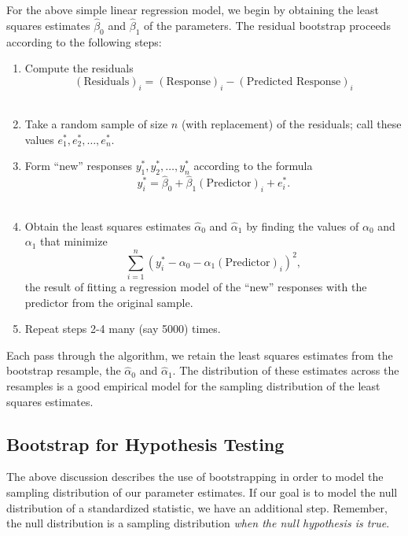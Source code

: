 \documentclass[
  letterpaper,
  DIV=11,
  numbers=noendperiod]{scrreprt}
\providecommand{\tightlist}{%
  \setlength{\itemsep}{0pt}\setlength{\parskip}{0pt}}\usepackage{longtable,booktabs,array}
\theoremstyle{definition}
\theoremstyle{definition}
\theoremstyle{plain}
\theoremstyle{remark}
\begin{document}
For the above simple linear regression model, we begin by obtaining the
least squares estimates \(\widehat{\beta}_0\) and \(\widehat{\beta}_1\)
of the parameters. The residual bootstrap proceeds according to the
following steps:

\begin{enumerate}
\def\labelenumi{\arabic{enumi}.}
\tightlist
\item
  Compute the residuals
  \[(\text{Residuals})_i = (\text{Response})_i - (\text{Predicted Response})_i\]\\
\item
  Take a random sample of size \(n\) (with replacement) of the
  residuals; call these values \(e_1^*, e_2^*, \dotsc, e_n^*\).\\
\item
  Form ``new'' responses \(y_1^*, y_2^*, \dotsc, y_n^*\) according to
  the formula
  \[y_i^* = \widehat{\beta}_0 + \widehat{\beta}_1 (\text{Predictor})_i + e_i^*.\]\\
\item
  Obtain the least squares estimates \(\widehat{\alpha}_0\) and
  \(\widehat{\alpha}_1\) by finding the values of \(\alpha_0\) and
  \(\alpha_1\) that minimize
  \[\sum_{i=1}^{n} \left(y_i^* - \alpha_0 - \alpha_1 (\text{Predictor})_i\right)^2,\]
  the result of fitting a regression model of the ``new'' responses with
  the predictor from the original sample.\\
\item
  Repeat steps 2-4 many (say 5000) times.
\end{enumerate}

Each pass through the algorithm, we retain the least squares estimates
from the bootstrap resample, the \(\widehat{\alpha}_0\) and
\(\widehat{\alpha}_1\). The distribution of these estimates across the
resamples is a good empirical model for the sampling distribution of the
least squares estimates.

\hypertarget{bootstrap-for-hypothesis-testing}{%
\subsection{Bootstrap for Hypothesis
Testing}\label{bootstrap-for-hypothesis-testing}}

The above discussion describes the use of bootstrapping in order to
model the sampling distribution of our parameter estimates. If our goal
is to model the null distribution of a standardized statistic, we have
an additional step. Remember, the null distribution is a sampling
distribution \emph{when the null hypothesis is true}.
\end{document}

